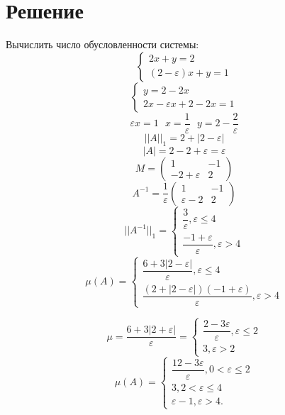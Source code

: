 \documentclass[14pt, titlepage,fleqn]{extarticle}
\begin{document}




	\section*{Решение}
	Вычислить число обусловленности системы:
	\[\begin{cases}
		2x + y = 2\\
		(2-\varepsilon)x+y=1
	\end{cases}\]
	\[\begin{cases}
		y = 2- 2x\\
		2x- \varepsilon x + 2 -2x = 1
	\end{cases}\]
\[\varepsilon x = 1~~~ x = \dfrac{1}{\varepsilon}~~~y = 2 - \dfrac{2}{\varepsilon}\]
	\[||A||_1 = 2 + |2-\varepsilon|\]
	\[|A| = 2 -2 + \varepsilon = \varepsilon\]
	\[M = \begin{pmatrix}
		1 & -1\\
		-2+\varepsilon & 2
	\end{pmatrix}\]
	\[A^{-1} = \dfrac{1}{\varepsilon}\begin{pmatrix}
		1 & -1\\
		\varepsilon - 2 & 2
	\end{pmatrix}\]
	\[||A^{-1}||_1 = \begin{cases}
		\dfrac{3}{\varepsilon}, \varepsilon \leq 4\\
		\dfrac{-1 + \varepsilon}{\varepsilon}, \varepsilon > 4
	\end{cases}\]
	\[\mu (A) = \begin{cases}
		\dfrac{6+3|2-\varepsilon|}{\varepsilon}, \varepsilon \leq 4\\
		\dfrac{(2+|2-\varepsilon|)(-1+\varepsilon)}{\varepsilon}, \varepsilon>4
	\end{cases}\]

\[\mu = \dfrac{6+3|2+\varepsilon|}{\varepsilon} = \begin{cases}
	\dfrac{2-3\varepsilon}{\varepsilon}, \varepsilon \leq 2\\
	3, \varepsilon > 2
\end{cases}\]
\[\mu(A) = \begin{cases}
	\dfrac{12 - 3\varepsilon}{\varepsilon}, 0 < \varepsilon \leq 2\\
	3, 2<\varepsilon \leq 4\\
	\varepsilon - 1,\varepsilon > 4.
\end{cases}\]
\end{document}
